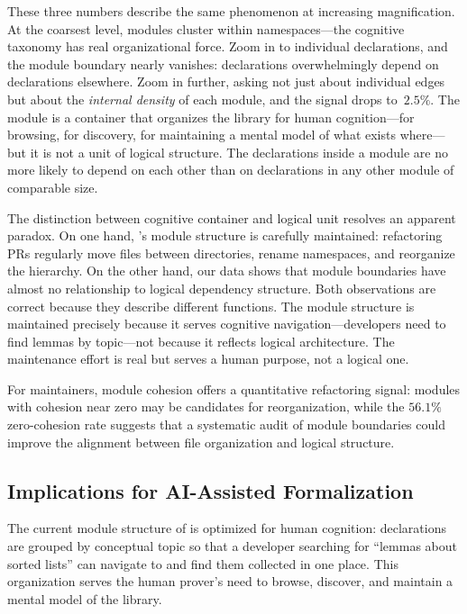 These three numbers describe the same phenomenon at increasing magnification. At the coarsest level, modules cluster within namespaces---the cognitive taxonomy has real organizational force. Zoom in to individual declarations, and the module boundary nearly vanishes: declarations overwhelmingly depend on declarations elsewhere. Zoom in further, asking not just about individual edges but about the \emph{internal density} of each module, and the signal drops to~$2.5\%$. The module is a container that organizes the library for human cognition---for browsing, for discovery, for maintaining a mental model of what exists where---but it is not a unit of logical structure. The declarations inside a module are no more likely to depend on each other than on declarations in any other module of comparable size.

\begin{remark}
\label{rem:module-role}
The distinction between cognitive container and logical unit resolves an apparent paradox. On one hand, 's module structure is carefully maintained: refactoring PRs regularly move files between directories, rename namespaces, and reorganize the hierarchy. On the other hand, our data shows that module boundaries have almost no relationship to logical dependency structure. Both observations are correct because they describe different functions. The module structure is maintained precisely because it serves cognitive navigation---developers need to find lemmas by topic---not because it reflects logical architecture. The maintenance effort is real but serves a human purpose, not a logical one.
\end{remark}

For  maintainers, module cohesion offers a quantitative refactoring signal: modules with cohesion near zero may be candidates for reorganization, while the $56.1\%$ zero-cohesion rate suggests that a systematic audit of module boundaries could improve the alignment between file organization and logical structure.

\subsection{Implications for AI-Assisted Formalization}
\label{sec:ai-implications}

The current module structure of  is optimized for human cognition: declarations are grouped by conceptual topic so that a developer searching for ``lemmas about sorted lists'' can navigate to  and find them collected in one place. This organization serves the human prover's need to browse, discover, and maintain a mental model of the library.

